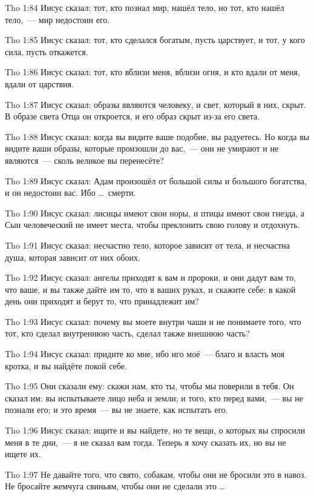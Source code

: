\vs Tho 1:84
Иисус сказал:
тот, кто познал мир, нашёл тело,
но тот, кто нашёл тело,~--- мир недостоин его.

\vs Tho 1:85
Иисус сказал:
тот, кто сделался богатым, пусть царствует,
и тот, у кого сила, пусть откажется.

\vs Tho 1:86
Иисус сказал:
тот, кто вблизи меня, вблизи огня,
и кто вдали от меня, вдали от царствия.

\vs Tho 1:87
Иисус сказал:
образы являются человеку, и свет, который в них, скрыт.
В образе света Отца он откроется,
и его образ скрыт из-за его света.

\vs Tho 1:88
Иисус сказал:
когда вы видите ваше подобие, вы радуетесь.
Но когда вы видите ваши образы,
которые произошли до вас,~--- они не умирают
и не являются~--- сколь великое вы перенесёте?

\vs Tho 1:89
Иисус сказал:
Адам произошёл от большой силы и большого богатства,
и он недостоин вас.
Ибо \ldots\ смерти.

\vs Tho 1:90
Иисус сказал:
лисицы имеют свои норы, и птицы имеют свои гнезда,
а Сын человеческий не имеет места,
чтобы преклонить свою голову и отдохнуть.

\vs Tho 1:91
Иисус сказал:
несчастно тело, которое зависит от тела,
и несчастна душа, которая зависит от них обоих.

\vs Tho 1:92
Иисус сказал:
ангелы приходят к вам и пророки, и они дадут вам то,
что ваше, и вы также дайте им то, что в ваших руках,
и скажите себе:
в какой день они приходят и берут то, что принадлежит им?

\vs Tho 1:93
Иисус сказал:
почему вы моете внутри чаши и не понимаете того,
что тот, кто сделал внутреннюю часть,
сделал также внешнюю часть?

\vs Tho 1:94
Иисус сказал:
придите ко мне, ибо иго моё~--- благо и власть моя кротка,
и вы найдёте покой себе.

\vs Tho 1:95
Они сказали ему:
скажи нам, кто ты, чтобы мы поверили в тебя.
Он сказал им: вы испытываете лицо неба и земли;
и того, кто перед вами,~--- вы не познали его;
и это время~--- вы не знаете, как испытать его.

\vs Tho 1:96
Иисус сказал:
ищите и вы найдете, но те вещи,
о которых вы спросили меня в те дни,~--- я не сказал вам тогда.
Теперь я хочу сказать их, но вы не ищете их.

\vs Tho 1:97
Не давайте того, что свято, собакам,
чтобы они не бросили это в навоз.
Не бросайте жемчуга свиньям, чтобы они не сделали это \ldots

